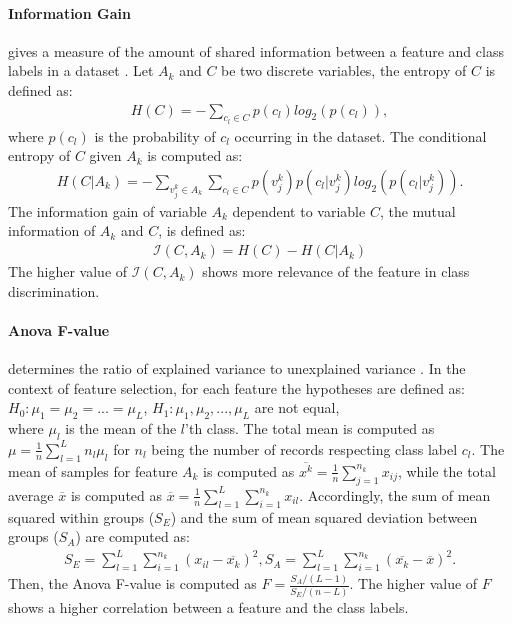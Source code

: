 \paragraph{Information Gain}
gives a measure of the amount of shared information between a feature and class labels in a dataset \cite{originalpaper}. Let $A_k$ and $C$ be two discrete variables, the entropy of $C$ is defined as:
\begin{align}
    H(C) = -\sum_{c_l \in C}{p(c_l)log_{2}(p(c_l))},
\end{align}
where $p(c_l)$ is the probability of $c_l$ occurring in the dataset. The conditional entropy of $C$ given $A_k$ is computed as:
\begin{align}
    H(C|A_k) = -\sum_{v^{k}_{j} \in A_{k}} \sum_{c_{l} \in C} p(v^{k}_{j})p(c_{l}|v^{k}_{j}) log_{2}(p(c_{l}|v^{k}_{j})).
\end{align}
The information gain of variable $A_k$ dependent to variable $C$, the mutual information of $A_k$ and $C$, is defined as:
\begin{align}
    \mathcal{I}(C, A_{k}) = H(C) - H(C|A_k)
\end{align}
The higher value of $\mathcal{I}(C, A_{k})$ shows more relevance of the feature in class discrimination.

\paragraph{Anova F-value}
determines the ratio of explained variance to unexplained variance \cite{originalpaper}. In the context of feature selection, for each feature the hypotheses are defined as:\\

$H_{0} : \mu_{1} = \mu_{2} = ... = \mu_{L}$, $H_{1} : \mu_{1}, \mu_{2}, ..., \mu_{L}$ are not equal,\\

where $\mu_{l}$ is the mean of the $l$'th class. The total mean is computed as $\mu = \frac{1}{n} \sum^{L}_{l=1} n_{l} \mu_{l}$ for $n_l$ being the number of records respecting class label $c_l$. The mean of samples for feature $A_k$ is computed as $\overline{x^k} = \frac{1}{n} \sum^{n_k}_{j=1}x_{ij}$, while the total average $\overline{x}$ is computed as $\overline{x} = \frac{1}{n} \sum^{L}_{l=1} \sum^{n_k}_{i=1} x_{il}$. Accordingly, the sum of mean squared within groups ($S_E$) and the sum of mean squared deviation between groups ($S_A$) are computed as:
\begin{align}
    S_{E} = \sum^{L}_{l=1} \sum^{n_k}_{i=1} (x_{il} - \overline{x_{k}})^2, S_{A} = \sum^{L}_{l=1} \sum^{n_k}_{i=1} (\overline{x_{k}} - \overline{x})^2.
\end{align}
Then, the Anova F-value is computed as $F = \frac{S_{A}/(L-1)}{S_{E}/(n-L)}$. The higher value of $F$ shows a higher correlation between a feature and the class labels.

